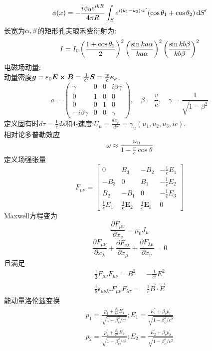 \documentclass[UTF8,9pt]{ctexart}
\begin{document}
$$\phi(x)=-\frac{i\psi_0e^{ikR}}{4\pi R}\int_{S}e^{i(k_1-k_2)\cdot x'}(\cos\theta_1+\cos\theta_2)\mathop{}\!\mathrm{d} S'$$
长宽为$\alpha,\beta$的矩形孔夫琅禾费衍射为:
$$I=I_0\left( \frac{1+\cos\theta_2}{2} \right)^2\left( \frac{\sin ka\alpha}{ka\alpha} \right)^2\left( \frac{\sin kb\beta}{kb\beta} \right)^2$$
电磁场动量:\\
动量密度$\bm{g}=\varepsilon_0\bm{E\times B}=\frac{1}{c^2}\bm{S}=\frac{w}{c}\bm{e}_k$. 
$$ 
a=\left(\begin{array}{cccc}{\gamma} & {0} & {0} & {i \beta \gamma} \\ {0} & {1} & {0} & {0} \\ {0} & {0} & {1} & {0} \\ {-i \beta \gamma} & {0} & {0} & {\gamma}\end{array}\right),\quad\beta=\frac{v}{c}, \quad \gamma=\frac{1}{\sqrt{1-\beta^{2}}}
 $$
定义固有时$d \tau=\frac{1}{c} d s$和4-速度:$U_{\mu}=\frac{d x_{\mu}}{d \tau}=\gamma_{u}\left(u_{1}, u_{2}, u_{3}, i c\right)$. \\
相对论多普勒效应
$$ 
\omega \approx \frac{\omega_{0}}{1-\frac{v}{c} \cos \theta}
 $$
定义场强张量
$$ 
F_{\mu \nu}=\left[\begin{array}{cccc}{0} & {B_{3}} & {-B_{2}} & {-\frac{1}{c} E_{1}} \\ {-B_{3}} & {0} & {B_{1}} & {-\frac{\mathbf{i}}{c} E_{2}} \\ {B_{2}} & {-B_{1}} & {0} & {-\frac{\mathbf{i}}{c} E_{3}} \\ {\frac{\mathbf{i}}{c} E_{1}} & {\frac{\mathbf{i}}{\boldsymbol{c}} \boldsymbol{E}_{2}} & {\frac{\mathbf{i}}{c} \boldsymbol{E}_{3}} & {0}\end{array}\right]
 $$
 Maxwell方程变为
 $$ 
\frac{\partial F_{\mu v}}{\partial x_{v}}=\mu_{0} J_{\mu}
 $$
 $$ 
\frac{\partial F_{\mu \nu}}{\partial x_{\lambda}}+\frac{\partial F_{v \lambda}}{\partial x_{\mu}}+\frac{\partial F_{\lambda \mu}}{\partial x_{v}}=0
 $$
 且满足
 $$ 
\begin{aligned} \frac{1}{2} F_{\mu \nu} F_{\mu \nu}=B^{2} &-\frac{1}{c^{2}} E^{2} \\ \frac{i}{8} \epsilon_{\mu \nu \lambda \tau} F_{\mu \nu} F_{\lambda \tau}=& \frac{1}{c} \vec{B} \cdot \vec{E} \end{aligned}
 $$
能动量洛伦兹变换
$$ 
\begin{array}{l}{p_{1}=\frac{p_{1}^{\prime}+\frac{\beta_{c}}{c^{2}} E_{1}^{\prime}}{\sqrt{1-\beta_{c}^{2} / c^{2}}} ; E_{1}=\frac{E_{1}^{\prime}+\beta_{c} p_{1}^{\prime}}{\sqrt{1-\beta_{c}^{2} / c^{2}}}} \\ {p_{2}=\frac{p_{2}^{\prime}+\frac{\beta_{c}}{c^{2}} E_{2}^{\prime}}{\sqrt{1-\beta_{c}^{2} / c^{2}}} ;E_{2}=\frac{E_{2}^{\prime}+\beta_{c} p_{2}^{\prime}}{\sqrt{1-\beta_{c}^{2} / c^{2}}}}\end{array}
 $$
\end{document}
